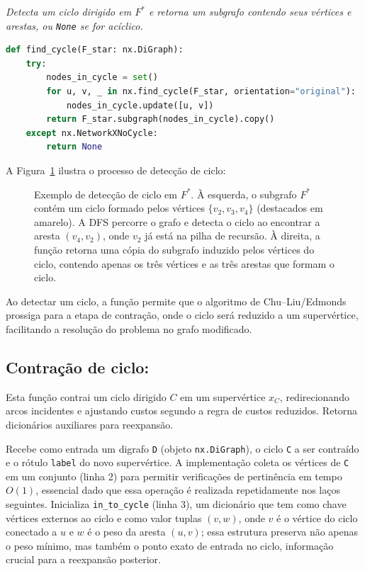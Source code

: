 \begin{tcolorbox}[
        enhanced, breakable,
        colframe=blue!60!black, colback=blue!2,
        colbacktitle=blue!15, coltitle=black,
        title={Detecção de ciclo dirigido em $F^*$},
        boxed title style={sharp corners, boxrule=0.6pt},
        sharp corners, boxrule=0.6pt
    ]
    \emph{Detecta um ciclo dirigido em $F^*$ e retorna um subgrafo contendo seus vértices e arestas, ou \texttt{None} se for acíclico.}
    \tcblower
    \begin{lstlisting}[mathescape=true, language=Python]
def find_cycle(F_star: nx.DiGraph):
    try:
        nodes_in_cycle = set()
        for u, v, _ in nx.find_cycle(F_star, orientation="original"):
            nodes_in_cycle.update([u, v])
        return F_star.subgraph(nodes_in_cycle).copy()
    except nx.NetworkXNoCycle:
        return None  
\end{lstlisting}
\end{tcolorbox}

A Figura~\ref{fig:find-cycle-example} ilustra o processo de detecção de ciclo:

\begin{figure}[H]
    \centering
    
    \caption{Exemplo de detecção de ciclo em \(F^*\). À esquerda, o subgrafo \(F^*\) contém um ciclo formado pelos vértices \(\{v_2, v_3, v_4\}\) (destacados em amarelo). A DFS percorre o grafo e detecta o ciclo ao encontrar a aresta \((v_4, v_2)\), onde \(v_2\) já está na pilha de recursão. À direita, a função retorna uma cópia do subgrafo induzido pelos vértices do ciclo, contendo apenas os três vértices e as três arestas que formam o ciclo.}
    \label{fig:find-cycle-example}
\end{figure}

Ao detectar um ciclo, a função permite que o algoritmo de Chu–Liu/Edmonds prossiga para a etapa de contração, onde o ciclo será reduzido a um supervértice, facilitando a resolução do problema no grafo modificado.

\subsection{Contração de ciclo:}
Esta função contrai um ciclo dirigido \(C\) em um supervértice \(x_C\), redirecionando arcos incidentes e ajustando custos segundo a regra de custos reduzidos. Retorna dicionários auxiliares para reexpansão.

Recebe como entrada um digrafo \texttt{D} (objeto \texttt{nx.DiGraph}), o ciclo \texttt{C} a ser contraído e o rótulo \texttt{label} do novo supervértice. A implementação coleta os vértices de \texttt{C} em um conjunto (linha 2) para permitir verificações de pertinência em tempo \(O(1)\), essencial dado que essa operação é realizada repetidamente nos laços seguintes. Inicializa \texttt{in\_to\_cycle} (linha 3), um dicionário que tem como chave vértices externos ao ciclo e como valor tuplas \((v,w)\), onde \(v\) é o vértice do ciclo conectado a \(u\) e \(w\) é o peso da aresta \((u,v)\); essa estrutura preserva não apenas o peso mínimo, mas também o ponto exato de entrada no ciclo, informação crucial para a reexpansão posterior.

